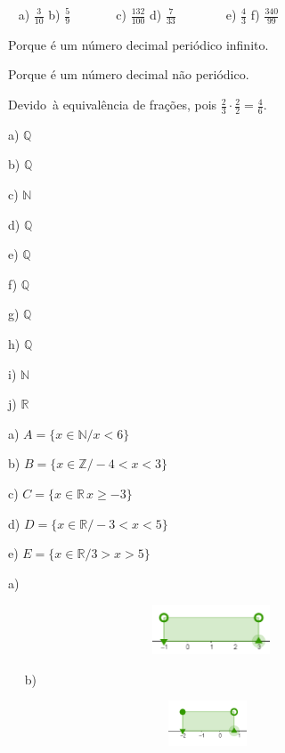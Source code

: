 \begin{respostas}{5}
	\ansitem{} ~ a)  \( \frac{3}{10} \) \quad  b)  \( \frac{5}{9} \) ~~~~~~  c)  \( \frac{132}{100} \) \quad d)  \( \frac{7}{33} \) ~~~~~ ~ e)  \( \frac{4}{3} \) \quad \quad f)  \( \frac{340}{99} \) ~~ 

	\ansitem{}Porque é um número decimal periódico infinito.

	\ansitem{}Porque é um número decimal não periódico.

	\ansitem{} Devido~à equivalência de frações, pois   \( \frac{2}{3} \cdot \frac{2}{2}=\frac{4}{6} \).
	
	\ansitem{}
\begin{multicols}{10}
	
	a) \( \mathbb{Q} \)
	
	b) \( \mathbb{Q} \)
	
	c) \( \mathbb{N} \)
	
	d) \( \mathbb{Q} \)
	
	e) \( \mathbb{Q} \)
	
	f) \( \mathbb{Q} \)

	g) \( \mathbb{Q} \)
	
	h) \( \mathbb{Q} \)
	
	i) \( \mathbb{N} \)
	
	j) $\mathbb{R}$
\end{multicols}
	\ansitem{}
	a) \( A =  \{ x \in \mathbb{N}/ x < 6 \}  \) 

	b)  \( B =  \{ x \in \mathbb{Z}/ -4 < x < 3 \}  \) 

	c)  \( C =  \{ x \in \mathbb{R}\frac{}{}x \geq -3 \}  \) 

	d)  \( D =  \{ x \in \mathbb{R} / -3 < x < 5 \}  \) 

	e)  \( E =  \{ x \in \mathbb{R} / 3 > x> 5 \}  \) 

	\ansitem{}
a)

\begin{figure}[H]
	\begin{Center}
		\includegraphics[width=3.92in,height=0.58in]{capitulos/conjuntos_numericos/media/image17.png}
	\end{Center}
\end{figure}

~~
 b)

\begin{figure}[H]
	\begin{Center}
		\includegraphics[width=3.83in,height=0.53in]{capitulos/conjuntos_numericos/media/image18.png}
	\end{Center}
\end{figure}


\end{respostas}
